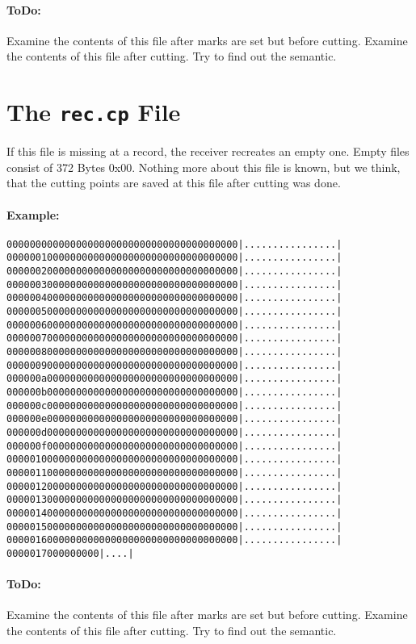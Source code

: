 \documentclass{scrartcl}
\begin{document}
\paragraph{ToDo:} Examine the contents of this file after marks are set but
before cutting. Examine the contents of this file after cutting. Try to find
out the semantic.

\section{The \texttt{rec.cp} File}
\label{sec:rec.cp-file}

If this file is missing at a record, the receiver recreates an empty
one. Empty files consist of 372 Bytes 0x00. Nothing more about this file is
known, but we think, that the cutting points are saved at this file after
cutting was done.

\paragraph{Example:}
{\small
\begin{alltt}\color{unknown}
00000000  00 00 00 00 00 00 00 00  00 00 00 00 00 00 00 00  |................|
00000010  00 00 00 00 00 00 00 00  00 00 00 00 00 00 00 00  |................|
00000020  00 00 00 00 00 00 00 00  00 00 00 00 00 00 00 00  |................|
00000030  00 00 00 00 00 00 00 00  00 00 00 00 00 00 00 00  |................|
00000040  00 00 00 00 00 00 00 00  00 00 00 00 00 00 00 00  |................|
00000050  00 00 00 00 00 00 00 00  00 00 00 00 00 00 00 00  |................|
00000060  00 00 00 00 00 00 00 00  00 00 00 00 00 00 00 00  |................|
00000070  00 00 00 00 00 00 00 00  00 00 00 00 00 00 00 00  |................|
00000080  00 00 00 00 00 00 00 00  00 00 00 00 00 00 00 00  |................|
00000090  00 00 00 00 00 00 00 00  00 00 00 00 00 00 00 00  |................|
000000a0  00 00 00 00 00 00 00 00  00 00 00 00 00 00 00 00  |................|
000000b0  00 00 00 00 00 00 00 00  00 00 00 00 00 00 00 00  |................|
000000c0  00 00 00 00 00 00 00 00  00 00 00 00 00 00 00 00  |................|
000000e0  00 00 00 00 00 00 00 00  00 00 00 00 00 00 00 00  |................|
000000d0  00 00 00 00 00 00 00 00  00 00 00 00 00 00 00 00  |................|
000000f0  00 00 00 00 00 00 00 00  00 00 00 00 00 00 00 00  |................|
00000100  00 00 00 00 00 00 00 00  00 00 00 00 00 00 00 00  |................|
00000110  00 00 00 00 00 00 00 00  00 00 00 00 00 00 00 00  |................|
00000120  00 00 00 00 00 00 00 00  00 00 00 00 00 00 00 00  |................|
00000130  00 00 00 00 00 00 00 00  00 00 00 00 00 00 00 00  |................|
00000140  00 00 00 00 00 00 00 00  00 00 00 00 00 00 00 00  |................|
00000150  00 00 00 00 00 00 00 00  00 00 00 00 00 00 00 00  |................|
00000160  00 00 00 00 00 00 00 00  00 00 00 00 00 00 00 00  |................|
00000170  00 00 00 00                                       |....|
\end{alltt}
}

\paragraph{ToDo:} Examine the contents of this file after marks are set but
before cutting. Examine the contents of this file after cutting. Try to find
out the semantic.


\end{document}
